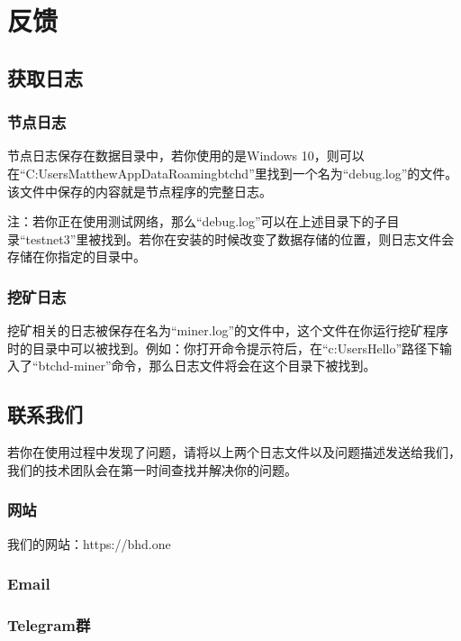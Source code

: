 \chapter{反馈}
\section{获取日志}
\subsection{节点日志}
\begin{flushleft}
    节点日志保存在数据目录中，若你使用的是Windows 10，则可以在``C:UsersMatthewAppDataRoamingbtchd''里找到一个名为``debug.log''的文件。该文件中保存的内容就是节点程序的完整日志。
\end{flushleft}
\small
\begin{flushleft}
    注：若你正在使用测试网络，那么``debug.log''可以在上述目录下的子目录``testnet3''里被找到。若你在安装的时候改变了数据存储的位置，则日志文件会存储在你指定的目录中。
\end{flushleft}
\normalsize
\subsection{挖矿日志}
\begin{flushleft}
    挖矿相关的日志被保存在名为``miner.log''的文件中，这个文件在你运行挖矿程序时的目录中可以被找到。例如：你打开命令提示符后，在``c:UsersHello''路径下输入了``btchd-miner''命令，那么日志文件将会在这个目录下被找到。
\end{flushleft}
\section{联系我们}
\begin{flushleft}
    若你在使用过程中发现了问题，请将以上两个日志文件以及问题描述发送给我们，我们的技术团队会在第一时间查找并解决你的问题。
\end{flushleft}
\subsection{网站}
\begin{flushleft}
    我们的网站：https://bhd.one
\end{flushleft}
\subsection{Email}
\subsection{Telegram群}
